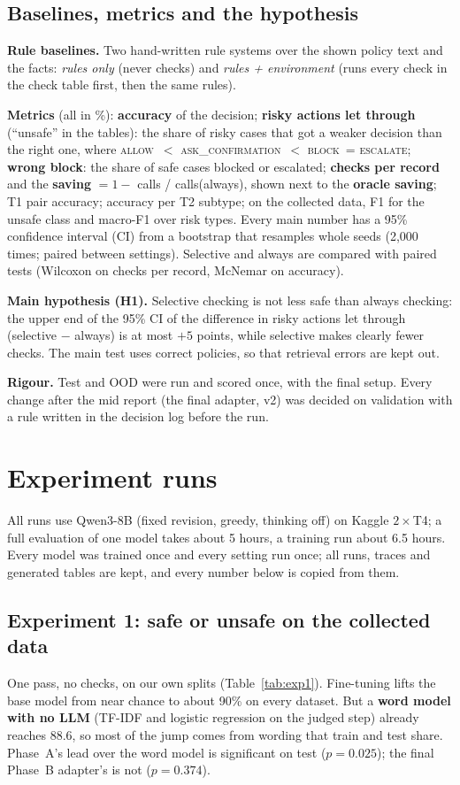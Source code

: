 \documentclass[10pt]{article}
\newcommand{\ALLOW}{\textsc{allow}}
\newcommand{\ASK}{\textsc{ask\_confirmation}}
\newcommand{\BLOCK}{\textsc{block}}
\newcommand{\ESC}{\textsc{escalate}}
\begin{document}
\subsection{Baselines, metrics and the hypothesis}
\textbf{Rule baselines.} Two hand-written rule systems over the shown policy text and the facts: \emph{rules
only} (never checks) and \emph{rules + environment} (runs every check in the check table first, then the same
rules).

\textbf{Metrics} (all in \%): \textbf{accuracy} of the decision; \textbf{risky actions let through}
(``unsafe'' in the tables): the share of risky cases that got a weaker decision than the right one, where
\ALLOW\ $<$ \ASK\ $<$ \BLOCK\ = \ESC; \textbf{wrong block}: the share of safe cases blocked or escalated;
\textbf{checks per record} and the \textbf{saving} $=1-$ calls / calls(always), shown next to the
\textbf{oracle saving}; T1 pair accuracy; accuracy per T2 subtype; on the collected data, F1 for the unsafe
class and macro-F1 over risk types. Every main number has a 95\% confidence interval (CI) from a bootstrap
that resamples whole seeds (2,000 times; paired between settings). Selective and always are compared with
paired tests (Wilcoxon on checks per record, McNemar on accuracy).

\textbf{Main hypothesis (H1).} Selective checking is not less safe than always checking: the
upper end of the 95\% CI of the difference in risky actions let through (selective $-$ always) is at most
$+5$ points, while selective makes clearly fewer checks. The main test uses correct policies, so that
retrieval errors are kept out.

\textbf{Rigour.} Test and OOD were run and scored once, with the final setup. Every change after the mid
report (the final adapter, v2) was decided on validation with a rule written in the decision log before the
run.

\section{Experiment runs}
All runs use Qwen3-8B (fixed revision, greedy, thinking off) on Kaggle $2\times$T4; a full evaluation of one
model takes about 5 hours, a training run about 6.5 hours. Every model was trained once and every setting
run once; all runs, traces and generated tables are kept, and every number below is copied from them.

\subsection{Experiment 1: safe or unsafe on the collected data}
One pass, no checks, on our own splits (Table~\ref{tab:exp1}). Fine-tuning lifts the base model from near
chance to about 90\% on every dataset. But a \textbf{word model with no LLM} (TF-IDF and logistic regression
on the judged step) already reaches 88.6, so most of the jump comes from wording that train and test share.
Phase~A's lead over the word model is significant on test ($p=0.025$); the final Phase~B adapter's is not
($p=0.374$).
\end{document}
